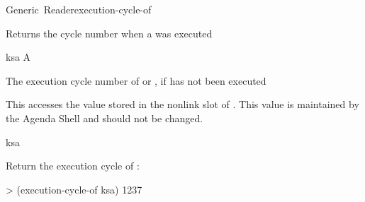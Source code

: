 \documentclass[10pt,twoside,english,pdftex]{article}
\begin{document}
\begin{functiondoc}{Generic~Reader}{execution-cycle-of}{ 
    \returns{} }
%
%

\fnsyntax

\fnpurpose Returns the cycle number when a  was executed

\fnmethods
{}

\fnpackage {}

\fnmodule {}

\fnargs
\begin{args}{ksa}
\arg[ksa] A 
\end{args}

\fnreturns The execution cycle number of  or \nil, if  has
not been executed
  
\fndescription 
This  accesses the value stored in the 
 nonlink slot of . This value is
maintained by the Agenda Shell and should not be changed.

\begin{alsos}{ksa}
\also[ksa]
\end{alsos}

\fnexample
Return the execution cycle of :
%
\W\supp
\begin{example}
> (execution-cycle-of ksa)
1237
\end{example}

\end{functiondoc}

 
\end{document}
